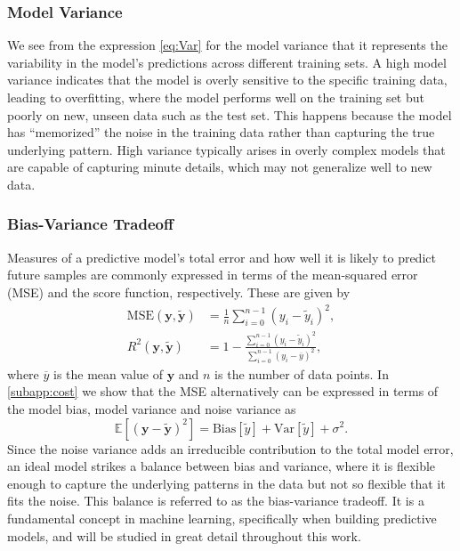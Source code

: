 \documentclass[aps,pra,english,notitlepage,reprint,nofootinbib]{revtex4-1}  %
\begin{document}
\vspace*{-2.5pt}
\subsubsection{Model Variance}
\vspace*{-2.5pt}
We see from the expression \eqref{eq:Var} for the model variance that it represents the variability in the model's predictions across different training sets. A high model variance indicates that the model is overly sensitive to the specific training data, leading to overfitting, where the model performs well on the training set but poorly on new, unseen data such as the test set. This happens because the model has ``memorized'' the noise in the training data rather than capturing the true underlying pattern. High variance typically arises in overly complex models that are capable of capturing minute details, which may not generalize well to new data.

\vspace*{-2.5pt}
\subsubsection{Bias-Variance Tradeoff}
\vspace*{-2.5pt}
Measures of a predictive model's total error and how well it is likely to predict future samples are commonly expressed in terms of the mean-squared error (MSE) and the score function, respectively. These are given by
\begin{align}
  \text{MSE}(\mathbf{y},\mathbf{\tilde{y}}) &= \frac{1}{n}\sum_{i=0}^{n-1}\left(y_i-\tilde{y}_i\right)^2, \label{eq:MSE}
  \\
  R^2(\mathbf{y},\mathbf{\tilde{y}}) &= 1 -\frac{\sum_{i=0}^{n-1}\left(y_i-\tilde{y}_i\right)^2}{\sum_{i=0}^{n-1}\left(y_i-\overline{y}\right)^2}, \label{eq:R2}
\end{align}
where $\overline{y}$ is the mean value of $\mathbf{y}$ and $n$ is the number of data points. In \cref{subapp:cost} we show that the MSE alternatively can be expressed in terms of the model bias, model variance and noise variance as 
\begin{equation}
  \mathbb{E}\left[(\mathbf{y}-\mathbf{\tilde{y}})^2 \right] = \text{Bias}[\tilde{y}] + \text{Var}[\tilde{y}] + \sigma^2. \label{eq:model error}
\end{equation}
Since the noise variance adds an irreducible contribution to the total model error, an ideal model strikes a balance between bias and variance, where it is flexible enough to capture the underlying patterns in the data but not so flexible that it fits the noise. This balance is referred to as the bias-variance tradeoff. It is a fundamental concept in machine learning, specifically when building predictive models, and will be studied in great detail throughout this work.
\end{document}
